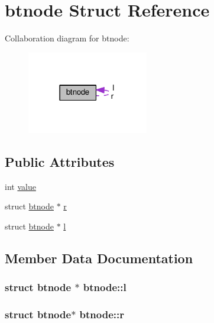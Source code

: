 \hypertarget{structbtnode}{}\section{btnode Struct Reference}
\label{structbtnode}


Collaboration diagram for btnode\+:
\nopagebreak
\begin{figure}[H]
\begin{center}
\leavevmode
\includegraphics[width=150pt]{structbtnode__coll__graph}
\end{center}
\end{figure}
\subsection*{Public Attributes}
\begin{DoxyCompactItemize}
\item 
int \hyperlink{structbtnode_a616f93e36ddf887708b73f6e74cd753e}{value}
\item 
struct \hyperlink{structbtnode}{btnode} $\ast$ \hyperlink{structbtnode_abe62c9ae71ac473ea157e9c6a63f84af}{r}
\item 
struct \hyperlink{structbtnode}{btnode} $\ast$ \hyperlink{structbtnode_aa602dd488fab26c3123e4a448dcd1b8d}{l}
\end{DoxyCompactItemize}


\subsection{Member Data Documentation}
\subsubsection[{\texorpdfstring{l}{l}}]{\setlength{\rightskip}{0pt plus 5cm}struct {\bf btnode} $\ast$ btnode\+::l}\hypertarget{structbtnode_aa602dd488fab26c3123e4a448dcd1b8d}{}\label{structbtnode_aa602dd488fab26c3123e4a448dcd1b8d}
\subsubsection[{\texorpdfstring{r}{r}}]{\setlength{\rightskip}{0pt plus 5cm}struct {\bf btnode}$\ast$ btnode\+::r}\hypertarget{structbtnode_abe62c9ae71ac473ea157e9c6a63f84af}{}\label{structbtnode_abe62c9ae71ac473ea157e9c6a63f84af}
